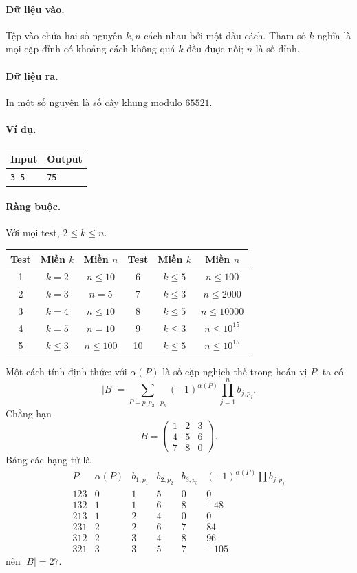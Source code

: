 \documentclass[11pt]{article}
\begin{document}
\paragraph{Dữ liệu vào.}
Tệp vào chứa hai số nguyên $k,n$ cách nhau bởi một dấu cách. Tham số $k$ nghĩa
là mọi cặp đỉnh có khoảng cách không quá $k$ đều được nối; $n$ là số đỉnh.

\paragraph{Dữ liệu ra.}
In một số nguyên là số cây khung modulo $65521$.

\paragraph{Ví dụ.}
\begin{center}
\begin{tabular}{ll}
\toprule
Input & Output\\
\midrule
\texttt{3 5} & \texttt{75}\\
\bottomrule
\end{tabular}
\end{center}

\paragraph{Ràng buộc.}
Với mọi test, $2\le k\le n$.
\begin{center}
\begin{tabular}{cccccc}
\toprule
Test & Miền $k$ & Miền $n$ & Test & Miền $k$ & Miền $n$\\
\midrule
1 & $k=2$ & $n\le 10$ & 6 & $k\le 5$ & $n\le 100$\\
2 & $k=3$ & $n=5$ & 7 & $k\le 3$ & $n\le 2000$\\
3 & $k=4$ & $n\le 10$ & 8 & $k\le 5$ & $n\le 10000$\\
4 & $k=5$ & $n=10$ & 9 & $k\le 3$ & $n\le 10^{15}$\\
5 & $k\le 3$ & $n\le 100$ & 10 & $k\le 5$ & $n\le 10^{15}$\\
\bottomrule
\end{tabular}
\end{center}

Một cách tính định thức: với $\alpha(P)$ là số cặp nghịch thế trong hoán vị
$P$, ta có
\[
  |B|=\sum_{P=p_1p_2\ldots p_n}(-1)^{\alpha(P)}
  \prod_{j=1}^{n} b_{j,p_j}.
\]
Chẳng hạn
\[
B=
\begin{pmatrix}
1&2&3\\
4&5&6\\
7&8&0
\end{pmatrix}.
\]
Bảng các hạng tử là
\[
\begin{array}{c|c|c|c|c|c}
P&\alpha(P)&b_{1,p_1}&b_{2,p_2}&b_{3,p_3}&
(-1)^{\alpha(P)}\prod b_{j,p_j}\\
\hline
123&0&1&5&0&0\\
132&1&1&6&8&-48\\
213&1&2&4&0&0\\
231&2&2&6&7&84\\
312&2&3&4&8&96\\
321&3&3&5&7&-105
\end{array}
\]
nên $|B|=27$.
\end{document}
